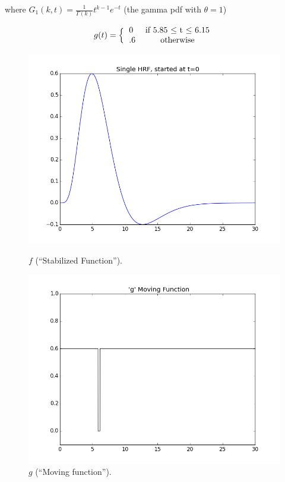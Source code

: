 where $G_1(k,t) =\frac{1}{\Gamma(k)} t^{k-1} e^{-t}$ (the gamma pdf with 
$\theta =1$)

\begin{equation} \label{eq:step}
 g(t)=\Big \{ \begin{tabular}{l c}
 		0  & if  5.85 $\leq$ t $\leq$ 6.15\\
 		.6  & otherwise \\
 		\end{tabular} \end{equation}
 		
 		
\begin{figure}[ht]
\centering
\begin{minipage}[b]{0.45\linewidth}
	\centering
	\includegraphics[width=.8\linewidth]{../images/hrf_pattern.png} 
	\caption{$f$ (``Stabilized Function'').}
	\label{fig:f}
\end{minipage}	
\quad
\begin{minipage}[b]{0.45\linewidth}
	\centering
		\includegraphics[width=.8\linewidth]{../images/play.png} 
	\caption{$g$ (``Moving function'').}
	\label{fig:g}
\end{minipage}
\end{figure}


